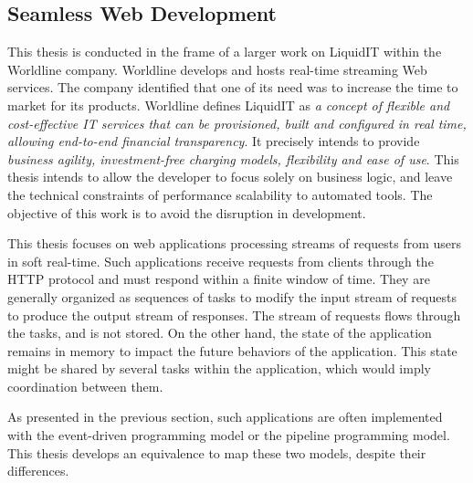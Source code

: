 \subsection{Seamless Web Development}

This thesis is conducted in the frame of a larger work on LiquidIT within the Worldline company.
Worldline develops and hosts real-time streaming Web services.
The company identified that one of its need was to increase the time to market for its products.
Worldline defines LiquidIT as \textit{a concept of flexible and cost-effective IT services that can be provisioned, built and configured in real time, allowing end-to-end financial transparency}.
It precisely intends to provide \textit{business agility, investment-free charging models, flexibility and ease of use}.
This thesis intends to allow the developer to focus solely on business logic, and leave the technical constraints of performance scalability to automated tools.
The objective of this work is to avoid the disruption in development.


This thesis focuses on web applications processing streams of requests from users in soft real-time.
Such applications receive requests from clients through the HTTP protocol and must respond within a finite window of time.
They are generally organized as sequences of tasks to modify the input stream of requests to produce the output stream of responses.
The stream of requests flows through the tasks, and is not stored.
On the other hand, the state of the application remains in memory to impact the future behaviors of the application.
This state might be shared by several tasks within the application, which would imply coordination between them.

As presented in the previous section, such applications are often implemented with the event-driven programming model or the pipeline programming model.
This thesis develops an equivalence to map these two models, despite their differences.


